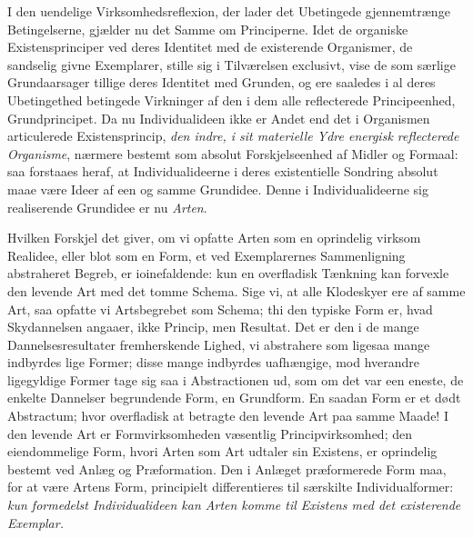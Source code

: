\documentclass[11pt]{book}
\newcommand{\opage}[1]{\marginnote{\footnotesize\textit{[#1]}}}
\begin{document}
I den uendelige Virksomhedsreflexion, der lader det Ubetingede
gjennemtrænge Betingelserne, gjælder nu det Samme om Principerne.
Idet de organiske Existensprinciper ved deres Identitet med de
existerende Organismer, de sandselig givne Exemplarer, stille sig i
Tilværelsen exclusivt, vise de som særlige Grundaarsager tillige deres
Identitet med Grunden, og ere saaledes i al deres Ubetingethed
betingede Virkninger af den i dem alle reflecterede Principeenhed,
Grundprincipet. Da nu Individualideen ikke er Andet end det i
Organismen articulerede Existensprincip, \emph{den indre, i sit
materielle Ydre energisk reflecterede Organisme}, nærmere bestemt som
absolut Forskjelseenhed af Midler og Formaal: saa forstaaes heraf, at
Individualideerne i deres existentielle Sondring absolut maae være
Ideer af een og samme Grundidee. Denne i Individualideerne sig
realiserende Grundidee er nu \emph{Arten}.

Hvilken Forskjel det giver, om vi opfatte Arten som en oprindelig
virksom Realidee, eller blot som en Form, et ved Exemplarernes
Sammenligning abstraheret Begreb, er ioinefaldende: kun en
overfladisk Tænkning kan forvexle den levende Art med det tomme
Schema. Sige vi, at alle Klodeskyer ere af samme Art, saa opfatte vi
Artsbegrebet som Schema; thi den typiske Form er, hvad
Skydannelsen angaaer, ikke Princip, men Resultat. Det er den i de
mange Dannelsesresultater fremherskende Lighed, vi abstrahere som
ligesaa mange indbyrdes lige Former; disse mange indbyrdes
uafhængige, mod hverandre ligegyldige Former tage sig saa i
Abstractionen ud, som om det var een eneste, de enkelte Dannelser
begrundende Form, en Grundform. En saadan Form er et dødt
Abstractum; hvor overfladisk at betragte den levende Art
\opage{323} \setcounter{footnote}{0}%
paa samme Maade! I den levende Art er Formvirksomheden
væsentlig Principvirksomhed; den eiendommelige Form, hvori Arten
som Art udtaler sin Existens, er oprindelig bestemt ved Anlæg og
Præformation. Den i Anlæget præformerede Form maa, for at være
Artens Form, principielt differentieres til særskilte Individualformer:
\emph{kun formedelst Individualideen kan Arten komme til Existens
med det existerende Exemplar.}
\end{document}
